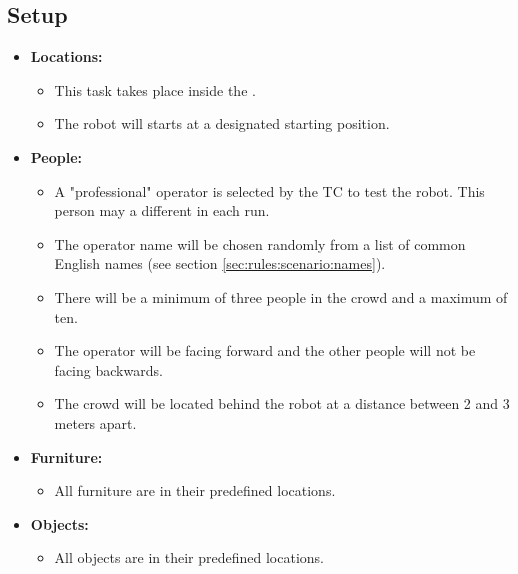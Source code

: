 \subsection*{Setup}
\begin{itemize}[nosep]	
	\item \textbf{Locations:} 
	\begin{itemize}
		\item This task takes place inside the \Arena{}.
		\item The robot will starts at a designated starting position. 
	\end{itemize}
	\item \textbf{People:} 
	\begin{itemize}
		\item A "professional" operator is selected by the TC to test the robot. This person may a different in each run. 
		\item The operator name will be chosen randomly from a list of common English names (see section \ref{sec:rules:scenario:names}).
		\item There will be a minimum of three people in the crowd and a maximum of ten.
		\item The operator will be facing forward and the other people will not be facing backwards.
		\item The crowd will be located behind the robot at a distance between 2 and 3 meters apart.
	\end{itemize}
	\item \textbf{Furniture:} 
	\begin{itemize}
		\item All furniture are in their predefined locations.
	\end{itemize}
    \item \textbf{Objects:} 
    \begin{itemize}
		\item All objects are in their predefined locations.
	\end{itemize}
\end{itemize}

